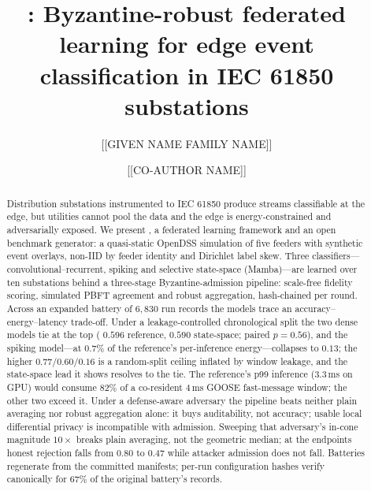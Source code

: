 \documentclass[preprint,11pt]{elsarticle}
\begin{document}
\begin{frontmatter}

\title{\sysname: Byzantine-robust federated learning for edge event
classification in IEC 61850 substations}

\author[aff1]{[[GIVEN NAME FAMILY NAME]]}

\author[aff1]{[[CO-AUTHOR NAME]]}


\begin{abstract}
Distribution substations instrumented to IEC 61850 produce streams
classifiable at the edge, but utilities cannot pool the data and the edge is
energy-constrained and adversarially exposed. We present \sysname, a federated
learning framework and an open benchmark generator: a quasi-static OpenDSS
simulation of five feeders with synthetic event overlays, non-IID by feeder
identity and Dirichlet label skew. Three
classifiers---convolutional--recurrent, spiking and selective state-space
(Mamba)---are learned over ten substations behind a three-stage
Byzantine-admission pipeline: scale-free fidelity scoring, simulated PBFT
agreement and robust aggregation, hash-chained per round. Across an expanded
battery of $6{,}830$ run records the models trace an
accuracy--energy--latency trade-off. Under a leakage-controlled chronological
split the two dense models tie at the top (\macroF{} $0.596$ reference,
$0.590$ state-space; paired $p=0.56$), and the spiking model---at $0.7\%$ of
the reference's per-inference
energy---collapses to $0.13$; the higher $0.77/0.60/0.16$ is a random-split
ceiling inflated by window leakage, and the state-space lead it shows resolves
to the tie. The reference's \mbox{p99}
inference ($3.3$\,ms on GPU) would consume $82\%$ of a co-resident $4$\,ms GOOSE
fast-message window; the other two exceed it. Under a defense-aware adversary
the pipeline beats neither plain averaging nor robust aggregation alone: it buys
auditability, not accuracy; usable local differential privacy is incompatible
with admission. Sweeping that adversary's in-cone magnitude $10\times$ breaks
plain averaging, not the geometric median; at the endpoints honest rejection
falls from $0.80$ to $0.47$ while attacker admission does not fall. Batteries
regenerate from the committed manifests; per-run configuration hashes verify
canonically for $67\%$ of the original battery's records.
\end{abstract}


\end{frontmatter}
\end{document}

